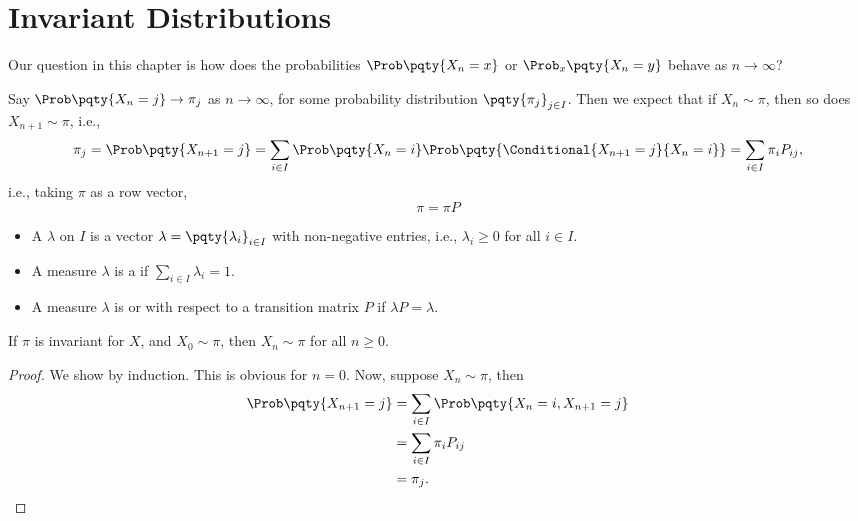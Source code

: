 \section{Invariant Distributions}

Our question in this chapter is how does the probabilities \(\Prob\pqty{X_n = x}\) or \(\Prob_x \pqty{X_n = y}\) behave as \(n \to \infty\)?

Say \(\Prob\pqty{X_n = j} \to \pi_j\) as \(n \to \infty\), for some probability distribution \(\pqty{\pi_j}_{j \in I}\). Then we expect that if \(X_n \sim \pi\), then so does \(X_{n + 1} \sim \pi\), i.e.,
\[
    \pi_j = \Prob\pqty{X_{n + 1} = j} = \sum_{i \in I} \Prob\pqty{X_n = i} \Prob\pqty{\Conditional{X_{n + 1} = j}{X_n = i}} = \sum_{i \in I} \pi_i P_{ij},
\]
i.e., taking \(\pi\) as a row vector,
\[
    \pi = \pi P
\]

\begin{definition}
    \begin{itemize}
        \item A  \(\lambda\) on \(I\) is a vector \(\lambda = \pqty{\lambda_i}_{i \in I}\) with non-negative entries, i.e., \(\lambda_i \ge 0\) for all \(i \in I\).
        \item A measure \(\lambda\) is a  if \(\sum_{i \in I} \lambda_i = 1\).
        \item A measure \(\lambda\) is  or  with respect to a transition matrix \(P\) if \(\lambda P = \lambda\).
    \end{itemize}
\end{definition}

\begin{theorem}
    If \(\pi\) is invariant for \(X\), and \(X_0 \sim \pi\), then \(X_n \sim \pi\) for all \(n \geq 0\).
\end{theorem}

\begin{proof}
    We show by induction. This is obvious for \(n = 0\). Now, suppose \(X_n \sim \pi\), then
    \begin{align*}
        \Prob\pqty{X_{n + 1} = j} &= \sum_{i \in I} \Prob\pqty{X_n = i, X_{n + 1} = j} \\
        &= \sum_{i \in I} \pi_i P_{ij} \\
        &= \pi_j.
    \end{align*}
\end{proof}

